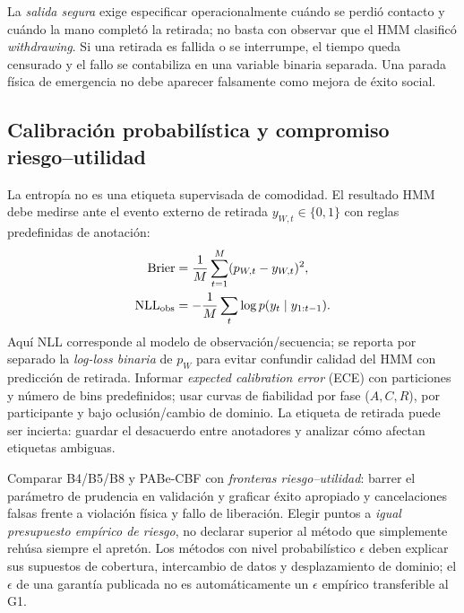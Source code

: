 \documentclass[10pt,a4paper,twocolumn]{article}
\begin{document}
La \emph{salida segura} exige especificar operacionalmente cuándo se perdió contacto y cuándo la mano completó la retirada; no basta con observar que el HMM clasificó \emph{withdrawing}. Si una retirada es fallida o se interrumpe, el tiempo queda censurado y el fallo se contabiliza en una variable binaria separada. Una parada física de emergencia no debe aparecer falsamente como mejora de éxito social.

\subsection{Calibración probabilística y compromiso riesgo--utilidad}
La entropía no es una etiqueta supervisada de comodidad. El resultado HMM debe medirse ante el evento externo de retirada $y_{W,t}\in\{0,1\}$ con reglas predefinidas de anotación:
\begin{align}
 \mathrm{Brier} & =\frac1{M}\sum_{t=1}^{M}(p_{W,t}-y_{W,t})^2,\\
 \mathrm{NLL}_{\rm obs} &=-\frac1M\sum_t\log p(y_t\mid y_{1:t-1}).
\end{align}
Aquí NLL corresponde al modelo de observación/secuencia; se reporta por separado la \emph{log-loss binaria} de $p_W$ para evitar confundir calidad del HMM con predicción de retirada. Informar \emph{expected calibration error} (ECE) con particiones y número de bins predefinidos; usar curvas de fiabilidad por fase ($A,C,R$), por participante y bajo oclusión/cambio de dominio. La etiqueta de retirada puede ser incierta: guardar el desacuerdo entre anotadores y analizar cómo afectan etiquetas ambiguas.

Comparar B4/B5/B8 y PABe-CBF con \emph{fronteras riesgo--utilidad}: barrer el parámetro de prudencia en validación y graficar éxito apropiado y cancelaciones falsas frente a violación física y fallo de liberación. Elegir puntos a \emph{igual presupuesto empírico de riesgo}, no declarar superior al método que simplemente rehúsa siempre el apretón. Los métodos con nivel probabilístico $\epsilon$ deben explicar sus supuestos de cobertura, intercambio de datos y desplazamiento de dominio; el $\epsilon$ de una garantía publicada no es automáticamente un $\epsilon$ empírico transferible al G1.
\end{document}

